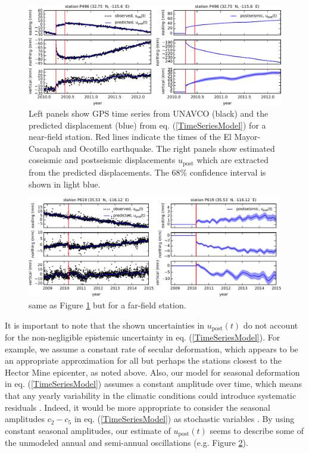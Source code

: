 \documentclass[draft,linenumbers]{AGUJournal}
\begin{document}
\begin{figure}
\includegraphics[scale=0.8]{Figures/FilterP496}
\centering
\caption{Left panels show GPS time series from UNAVCO (black) and the predicted displacement (blue) from eq. (\ref{TimeSeriesModel}) for a near-field station.  Red lines indicate the times of the El Mayor-Cucapah and Ocotillo earthquake. The right panels show estimated coseismic and postseismic displacements $u_\mathrm{post}$ which are extracted from the predicted displacements.  The 68\% confidence interval is shown in light blue.}
\label{fig:P496}
\end{figure}

\begin{figure}
\includegraphics[scale=0.8]{Figures/FilterP619}
\centering
\caption{same as Figure \ref{fig:P496} but for a far-field station.} 
\label{fig:P619}
\end{figure}

It is important to note that the shown uncertainties in $u_\mathrm{post}(t)$ do not account for the non-negligible epistemic uncertainty in eq. (\ref{TimeSeriesModel}).  For example, we assume a constant rate of secular deformation, which appears to be an appropriate approximation for all but perhaps the stations closest to the Hector Mine epicenter, as noted above.  Also, our model for seasonal deformation in eq. (\ref{TimeSeriesModel}) assumes a constant amplitude over time, which means that any yearly variability in the climatic conditions could introduce systematic residuals \citep{Davis2012}. Indeed, it would be more appropriate to consider the seasonal amplitudes $c_2-c_5$ in eq. (\ref{TimeSeriesModel}) as stochastic variables \citep{Murray2005}. By using constant seasonal amplitudes, our estimate of $u_\mathrm{post}(t)$ seems to describe some of the unmodeled annual and semi-annual oscillations (e.g. Figure \ref{fig:P619}).          
\end{document}
